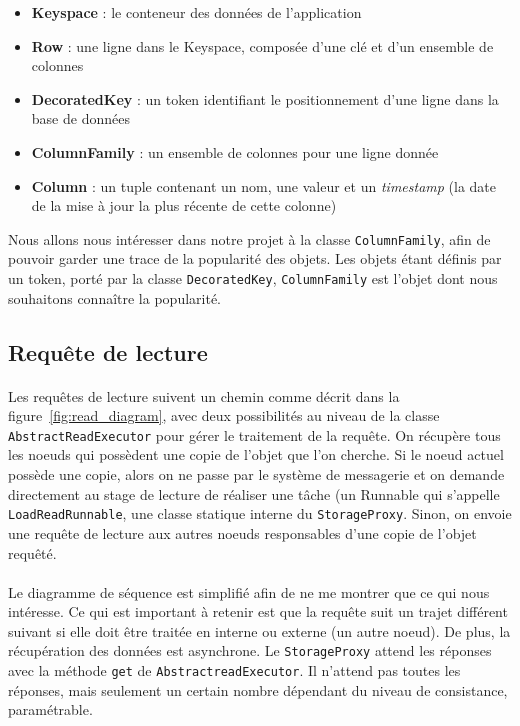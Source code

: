 \documentclass[12pt]{article}
\newcommand{\class}[1]{\texttt{#1}}
\begin{document}
\begin{itemize}
	\item \textbf{Keyspace} : le conteneur des données de l'application
	\item \textbf{Row} : une ligne dans le Keyspace, composée d'une clé et d'un ensemble de colonnes
	\item \textbf{DecoratedKey} : un token identifiant le positionnement d'une ligne dans la base de données
	\item \textbf{ColumnFamily} : un ensemble de colonnes pour une ligne donnée
	\item \textbf{Column} : un tuple contenant un nom, une valeur et un \textit{timestamp} (la date de la mise à jour la plus récente de cette colonne)
\end{itemize}

Nous allons nous intéresser dans notre projet à la classe \class{ColumnFamily}, afin de pouvoir garder une trace de la popularité des objets. Les objets étant définis par un token, porté par la classe \class{DecoratedKey}, \class{ColumnFamily} est l'objet dont nous souhaitons connaître la popularité.

\subsection{Requête de lecture}

\paragraph{}Les requêtes de lecture suivent un chemin comme décrit dans la figure~\ref{fig:read_diagram}, avec deux possibilités au niveau de la classe \class{AbstractReadExecutor} pour gérer le traitement de la requête. On récupère tous les noeuds qui possèdent une copie de l'objet que l'on cherche. Si le noeud actuel possède une copie, alors on ne passe par le système de messagerie et on demande directement au stage de lecture de réaliser une tâche (un Runnable qui s'appelle \class{LoadReadRunnable}, une classe statique interne du \class{StorageProxy}. Sinon, on envoie une requête de lecture aux autres noeuds responsables d'une copie de l'objet requêté.

\paragraph{}Le diagramme de séquence est simplifié afin de ne me montrer que ce qui nous intéresse. Ce qui est important à retenir est que la requête suit un trajet différent suivant si elle doit être traitée en interne ou externe (un autre noeud). De plus, la récupération des données est asynchrone. Le \class{StorageProxy} attend les réponses avec la méthode \texttt{get} de \class{AbstractreadExecutor}. Il n'attend pas toutes les réponses, mais seulement un certain nombre dépendant du niveau de consistance, paramétrable.
\end{document}
